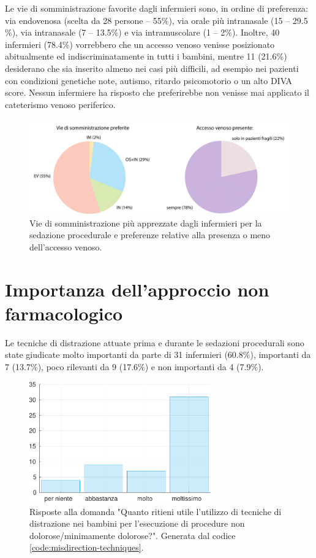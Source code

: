 Le vie di somministrazione favorite dagli infermieri sono, in ordine di preferenza: via endovenosa (scelta da 28 persone -- 55$\%$), via orale più intranasale (15 -- 29.5$\%$), via intranasale (7 -- 13.5$\%$) e via intramuscolare (1 -- 2$\%$). Inoltre, 40 infermieri (78.4$\%$) vorrebbero che un accesso venoso venisse posizionato abitualmente ed indiscriminatamente in tutti i bambini, mentre 11 (21.6$\%$) desiderano che sia inserito almeno nei casi più difficili, ad esempio nei pazienti con condizioni genetiche note, autismo, ritardo psicomotorio o un alto DIVA score. Nessun infermiere ha risposto che preferirebbe non venisse mai applicato il cateterismo venoso periferico. 

\begin{figure}[!h]
    \centering
    \includegraphics[width=1\textwidth]{Figure/sommicrosoftchiaro.pdf}
    \caption{Vie di somministrazione più apprezzate dagli infermieri per la sedazione procedurale e preferenze relative alla presenza o meno dell'accesso venoso.}
    \label{fig:viedisomm}
\end{figure}

\newpage

\section{Importanza dell'approccio non farmacologico}

Le tecniche di distrazione attuate prima e durante le sedazioni procedurali sono state giudicate molto importanti da parte di 31 infermieri (60.8$\%$), importanti da 7 (13.7$\%$), poco rilevanti da 9 (17.6$\%$) e non importanti da 4 (7.9$\%$).

\bigskip

\begin{figure}[!h]
    \centering
    \includegraphics[width=0.7\textwidth]{Figure/distrazione.pdf}
    \caption{Risposte alla domanda "Quanto ritieni utile l’utilizzo di tecniche di distrazione nei bambini per l’esecuzione di procedure non dolorose/minimamente dolorose?". Generata dal codice \ref{code:misdirection-techniques}.}
    \label{fig:distrazione}
\end{figure}

